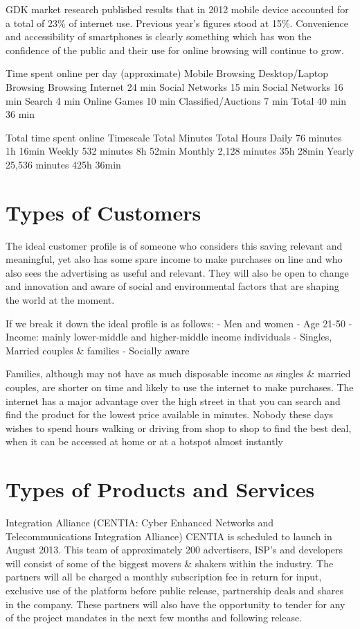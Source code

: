 \documentclass[letterpaper,10pt,openany,oneside,english]{sphinxmanual}
\begin{document}
GDK market research published results that in 2012 mobile device accounted for a total of 23\% of internet use. Previous year’s figures stood at 15\%. Convenience and accessibility of smartphones is clearly something which has won the confidence of the public and their use for online browsing will continue to grow.

Time spent online per day (approximate)
Mobile Browsing Desktop/Laptop Browsing
Browsing Internet 24 min Social Networks 15 min
Social Networks 16 min Search 4 min
Online Games 10 min
Classified/Auctions 7 min
Total 40 min 36 min

Total time spent online
Timescale Total Minutes Total Hours
Daily 76 minutes 1h 16min
Weekly 532 minutes 8h 52min
Monthly 2,128 minutes 35h 28min
Yearly 25,536 minutes 425h 36min


\section{Types of Customers}
\label{\detokenize{market-analysis:types-of-customers}}
The ideal customer profile is of someone who considers this saving relevant and meaningful, yet also has some spare income to make purchases on line and who also sees the advertising as useful and relevant. They will also be open to change and innovation and aware of social and environmental factors that are shaping the world at the moment.

If we break it down the ideal profile is as follows:
- Men and women
- Age 21-50
- Income: mainly lower-middle and higher-middle income individuals
- Singles, Married couples \& families
- Socially aware

Families, although may not have as much disposable income as singles \& married couples, are shorter on time and likely to use the internet to make purchases. The internet has a major advantage over the high street in that you can search and find the product for the lowest price available in minutes. Nobody these days wishes to spend hours walking or driving from shop to shop to find the best deal, when it can be accessed at home or at a hotspot almost instantly


\section{Types of Products and Services}
\label{\detokenize{market-analysis:types-of-products-and-services}}
Integration Alliance (CENTIA: Cyber Enhanced Networks and Telecommunications Integration Alliance) CENTIA is scheduled to launch in August 2013. This team of approximately 200 advertisers, ISP’s and developers will consist of some of the biggest movers \& shakers within the industry. The partners will all be charged a monthly subscription fee in return for input, exclusive use of the platform before public release, partnership deals and shares in the company. These partners will also have the opportunity to tender for any of the project mandates in the next few months and following release.
\end{document}
